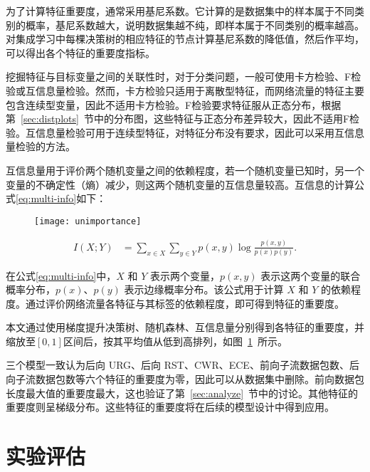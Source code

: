 {为了计算特征重要度，通常采用基尼系数。它计算的是数据集中的样本属于不同类别的概率，基尼系数越大，说明数据集越不纯，即样本属于不同类别的概率越高。对集成学习中每棵决策树的相应特征的节点计算基尼系数的降低值，然后作平均，可以得出各个特征的重要度指标。

挖掘特征与目标变量之间的关联性时，对于分类问题，一般可使用卡方检验、F检验或互信息量检验。然而，卡方检验只适用于离散型特征，而网络流量的特征主要包含连续型变量，因此不适用卡方检验。F检验要求特征服从正态分布，根据第~\ref{sec:distplots}~节中的分布图，这些特征与正态分布差异较大，因此不适用F检验。互信息量检验可用于连续型特征，对特征分布没有要求，因此可以采用互信息量检验的方法。

互信息量用于评价两个随机变量之间的依赖程度，若一个随机变量已知时，另一个变量的不确定性（熵）减少，则这两个随机变量的互信息量较高。互信息的计算公式\eqref{eq:multi-info}如下：

\begin{figure}[t]
    \centering
    \texttt{[image: unimportance]}
    \label{fig:unimportance}

\end{figure}

\begin{equation}
    \label{eq:multi-info}
    \begin{split}
        I(X;Y) &= \sum_{x \in X} \sum_{y \in Y} p(x,y) \log \frac{p(x,y)}{p(x)p(y)}.
    \end{split}
\end{equation}

在公式\eqref{eq:multi-info}中，$X$ 和 $Y$ 表示两个变量，$p(x,y)$ 表示这两个变量的联合概率分布，$p(x)$、$p(y)$ 表示边缘概率分布。该公式用于计算 $X$ 和 $Y$ 的依赖程度。通过评价网络流量各特征与其标签的依赖程度，即可得到特征的重要度。

本文通过使用梯度提升决策树、随机森林、互信息量分别得到各特征的重要度，并缩放至$\left[0,1\right]$区间后，按其平均值从低到高排列，如图~\ref{fig:unimportance}~所示。

三个模型一致认为后向 URG、后向 RST、CWR、ECE、前向子流数据包数、后向子流数据包数等六个特征的重要度为零，因此可以从数据集中删除。前向数据包长度最大值的重要度最大，这也验证了第~\ref{sec:analyze}~节中的讨论。其他特征的重要度则呈梯级分布。这些特征的重要度将在后续的模型设计中得到应用。

\section{实验评估}

}
